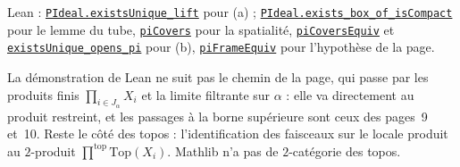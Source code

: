 \noindent Lean : \href{\leanblobmain/CategoryTheory/Folder161_3.lean}{\texttt{PIdeal.\allowbreak{}existsUnique\_lift}} pour (a) ; \href{\leanblobmain/CategoryTheory/Folder161_3.lean}{\texttt{PIdeal.\allowbreak{}exists\_box\_of\_isCompact}} pour le lemme du tube, \href{\leanblobmain/CategoryTheory/Folder161_3.lean}{\texttt{piCovers}} pour la spatialité, \href{\leanblobmain/CategoryTheory/Folder161_3.lean}{\texttt{piCoversEquiv}} et \href{\leanblobmain/CategoryTheory/Folder161_3.lean}{\texttt{existsUnique\_opens\_pi}} pour (b), \href{\leanblobmain/CategoryTheory/Folder161_3.lean}{\texttt{piFrameEquiv}} pour l'hypothèse de la page.

\begin{remarque}
La démonstration de Lean ne suit pas le chemin de la page, qui passe par les produits finis $\prod_{i \in J_\alpha} X_i$ et la limite filtrante sur $\alpha$ : elle va directement au produit restreint, et les passages à la borne supérieure sont ceux des pages~9 et~10. Reste le côté des topos : l'identification des faisceaux sur le locale produit au $2$-produit $\prod^{\mathrm{top}} \mathrm{Top}(X_i)$. Mathlib n'a pas de $2$-catégorie des topos.
\end{remarque}
